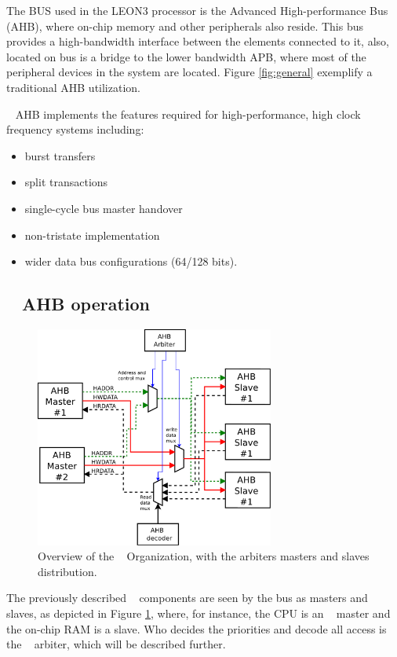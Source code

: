 The BUS used in the LEON3 processor is the Advanced High-performance Bus (AHB), where on-chip memory and other peripherals also reside. This bus provides a high-bandwidth interface between the elements connected to it, also, located on bus is a bridge to the lower bandwidth APB, where most of the peripheral devices in the system are located. Figure \ref{fig:general} exemplify a traditional AHB utilization.

\amba~ AHB implements the features required for high-performance, high clock
frequency systems including:
\begin{itemize}
 \item {burst transfers}
\item {split transactions}
\item {single-cycle bus master handover}
\item {non-tristate implementation}
\item {wider data bus configurations (64/128 bits).}
\end{itemize}

 
\subsection{\amba~ AHB operation}

\begin{figure}[!ht]
    \centering
    \includegraphics[width=0.7\textwidth]{figures/pdf/amba2_arbiter.pdf}
    \caption{Overview  of the \amba~ Organization, with the arbiters masters and slaves distribution.}
    \label{fig:internorg}
\end{figure}

The previously described \amba~ components are seen by the bus as masters and slaves, as depicted in Figure \ref{fig:internorg}, where, for instance, the CPU is an \amba~ master and the on-chip RAM is a slave. Who decides the priorities and decode all access  is the \amba~ arbiter, which will be described further.


